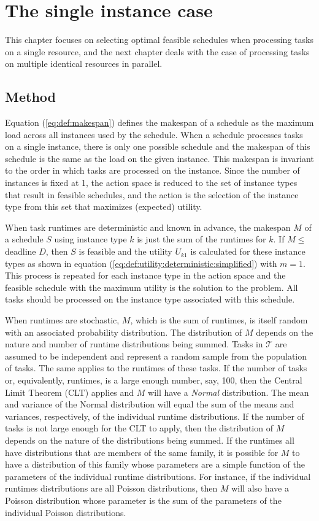 \documentclass[12pt]{report}
\begin{document}
\chapter{The single instance case}

This chapter focuses on selecting optimal feasible schedules when processing tasks on a single resource, and the next chapter deals with the case of processing tasks on multiple identical resources in parallel.

\section{Method}

Equation (\ref{eq:def:makespan}) defines the makespan of a schedule as the maximum load across all instances used by the schedule.
When a schedule processes tasks on a single instance, there is only one possible schedule and the makespan of this schedule is the same as the load on the given instance.
This makespan is invariant to the order in which tasks are processed on the instance.
Since the number of instances is fixed at 1, the action space is reduced to the set of instance types that result in feasible schedules, and the action is the selection of the instance type from this set that maximizes (expected) utility.

When task runtimes are deterministic and known in advance, the makespan $M$ of a schedule $S$ using instance type $k$ is just the sum of the runtimes for $k$.
If $M \le $ deadline $D$, then $S$ is feasible and the utility $U_{k1}$ is calculated for these instance types as shown in equation (\ref{eq:def:utility:deterministic:simplified}) with $m=1$.
This process is repeated for each instance type in the action space and the feasible schedule with the maximum utility is the solution to the problem.
All tasks should be processed on the instance type associated with this schedule.

When runtimes are stochastic, $M$, which is the sum of runtimes, is itself random with an associated probability distribution.
The distribution of $M$ depends on the nature and number of runtime distributions being summed.
Tasks in $\mathcal{T}$ are assumed to be independent and represent a random sample from the population of tasks.
The same applies to the runtimes of these tasks.
If the number of tasks or, equivalently, runtimes, is a large enough number, say, 100, then the Central Limit Theorem (CLT) applies and $M$ will have a \textit{Normal} distribution.
The mean and variance of the Normal distribution will equal the sum of the means and variances, respectively, of the individual runtime distributions.
If the number of tasks is not large enough for the CLT to apply, then the distribution of $M$ depends on the nature of the distributions being summed.
If the runtimes all have distributions that are members of the same family, it is possible for $M$ to have a distribution of this family whose parameters are a simple function of the parameters of the individual runtime distributions.
For instance, if the individual runtimes distributions are all Poisson distributions, then $M$ will also have a Poisson distribution whose parameter is the sum of the parameters of the individual Poisson distributions.
\end{document}
